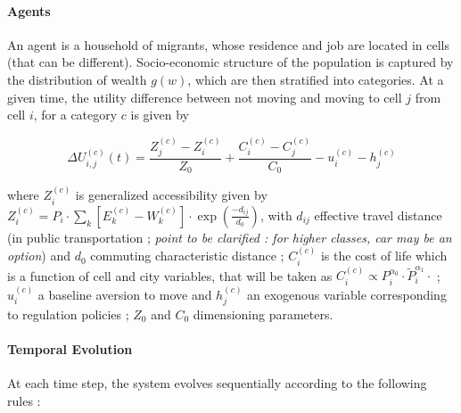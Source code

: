 \paragraph{Agents}

An agent is a household of migrants, whose residence and job are located in cells (that can be different). Socio-economic structure of the population is captured by the distribution of wealth $g(w)$, which are then stratified into categories. At a given time, the utility difference between not moving and moving to cell $j$ from cell $i$, for a category $c$ is given by

\[
\Delta U_{i,j}^{(c)}(t) = \frac{Z_j^{(c)}- Z_i^{(c)}}{Z_0} + \frac{C_i^{(c)}- C_j^{(c)}}{C_0} - u_i^{(c)} - h_j^{(c)}
\]

where $Z_i^{(c)}$ is generalized accessibility given by $Z_i^{(c)} = P_i \cdot \sum_k \left[E_k^{(c)}-W_k^{(c)}\right]\cdot \exp{\left(\frac{-d_{ij}}{d_0}\right)}$, with $d_{ij}$ effective travel distance (in public transportation ; \textit{point to be clarified : for higher classes, car may be an option}) and $d_0$ commuting characteristic distance ; $C_i^{(c)}$ is the cost of life which is a function of cell and city variables, that will be taken as $C_i^{(c)} \propto P_i^{\alpha_0}\cdot  \tilde{P}_i^{\alpha_1}\cdot$ ; $u_i^{(c)}$ a baseline aversion to move and $h_j^{(c)}$ an exogenous variable corresponding to regulation policies ; $Z_0$ and $C_0$ dimensioning parameters.

\paragraph{Temporal Evolution}

At each time step, the system evolves sequentially according to the following rules :

